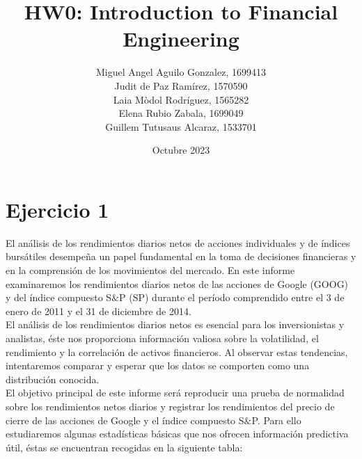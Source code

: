 \documentclass[a4paper,]{article}
\title{\textbf{HW0: Introduction to Financial Engineering}}
\author{Miguel Angel Aguilo Gonzalez, 1699413 \\ Judit de Paz Ramírez, 1570590 \\ Laia Mòdol Rodríguez, 1565282 \\ Elena Rubio Zabala, 1699049 \\ Guillem Tutusaus Alcaraz, 1533701 }
\date{Octubre 2023}
\begin{document}
\maketitle
\newpage

\section*{Ejercicio 1}
El análisis de los rendimientos diarios netos de acciones individuales y de índices bursátiles desempeña un papel fundamental en la toma de decisiones financieras y en la comprensión de los movimientos del mercado. En este informe examinaremos los rendimientos diarios netos de las acciones de Google (GOOG) y del índice compuesto S$\&$P (SP) durante el período comprendido entre el 3 de enero de 2011 y el 31 de diciembre de 2014.
\\

El análisis de los rendimientos diarios netos es esencial para los inversionistas y analistas, éste nos proporciona información valiosa sobre la volatilidad, el rendimiento y la correlación de activos financieros. Al observar estas tendencias, intentaremos comparar y esperar que los datos se comporten como una distribución conocida.\\

El objetivo principal de este informe será reproducir una prueba de normalidad sobre los rendimientos netos diarios y registrar los rendimientos del precio de cierre de las acciones de Google y el índice compuesto S$\&$P.  Para ello estudiaremos algunas estadísticas básicas que nos ofrecen información predictiva útil, éstas se encuentran recogidas en la siguiente tabla:\\
\end{document}
